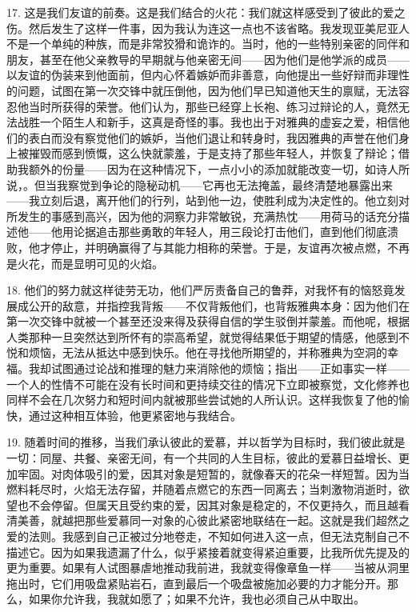 17. 这是我们友谊的前奏。这是我们结合的火花：我们就这样感受到了彼此的爱之伤。然后发生了这样一件事，因为我认为连这一点也不该省略。我发现亚美尼亚人不是一个单纯的种族，而是非常狡猾和诡诈的。当时，他的一些特别亲密的同伴和朋友，甚至在他父亲教导的早期就与他亲密无间——因为他们是他学派的成员——以友谊的伪装来到他面前，但内心怀着嫉妒而非善意，向他提出一些好辩而非理性的问题，试图在第一次交锋中就压倒他，因为他们早已知道他天生的禀赋，无法容忍他当时所获得的荣誉。他们认为，那些已经穿上长袍、练习过辩论的人，竟然无法战胜一个陌生人和新手，这真是奇怪的事。我也出于对雅典的虚妄之爱，相信他们的表白而没有察觉他们的嫉妒，当他们退让和转身时，我因雅典的声誉在他们身上被摧毁而感到愤慨，这么快就蒙羞，于是支持了那些年轻人，并恢复了辩论；借助我额外的份量——因为在这种情况下，一点小小的添加就能改变一切，如诗人所说，。但当我察觉到争论的隐秘动机——它再也无法掩盖，最终清楚地暴露出来——我立刻后退，离开他们的行列，站到他一边，使胜利成为决定性的。他立刻对所发生的事感到高兴，因为他的洞察力非常敏锐，充满热忱——用荷马的话充分描述他——他用论据追击那些勇敢的年轻人，用三段论打击他们，直到他们彻底溃败，他才停止，并明确赢得了与其能力相称的荣誉。于是，友谊再次被点燃，不再是火花，而是显明可见的火焰。\par

18. 他们的努力就这样徒劳无功，他们严厉责备自己的鲁莽，对我怀有的恼怒竟发展成公开的敌意，并指控我背叛——不仅背叛他们，也背叛雅典本身：因为他们在第一次交锋中就被一个甚至还没来得及获得自信的学生驳倒并蒙羞。而他呢，根据人类那种一旦突然达到所怀有的崇高希望，就觉得结果低于期望的情感，他感到不悦和烦恼，无法从抵达中感到快乐。他在寻找他所期望的，并称雅典为空洞的幸福。我却试图通过论战和推理的魅力来消除他的烦恼；指出——正如事实一样——一个人的性情不可能在没有长时间和更持续交往的情况下立即被察觉，文化修养也同样不会在几次努力和短时间内就被那些尝试她的人所认识。这样我恢复了他的愉快，通过这种相互体验，他更紧密地与我结合。\par

19. 随着时间的推移，当我们承认彼此的爱慕，并以哲学为目标时，我们彼此就是一切：同屋、共餐、亲密无间，有一个共同的人生目标，彼此的爱慕日益增长、更加牢固。对肉体吸引的爱，因其对象是短暂的，就像春天的花朵一样短暂。因为当燃料耗尽时，火焰无法存留，并随着点燃它的东西一同离去；当刺激物消逝时，欲望也不会停留。但属天且受约束的爱，因其对象是稳定的，不仅更持久，而且越看清美善，就越把那些爱慕同一对象的心彼此紧密地联结在一起。这就是我们超然之爱的法则。我感到自己正被过分地卷走，不知如何进入这一点，但无法克制自己不描述它。因为如果我遗漏了什么，似乎紧接着就变得紧迫重要，比我所优先提及的更为重要。如果有人试图暴虐地推动我前进，我就变得像章鱼一样——当被从洞里拖出时，它们用吸盘紧贴岩石，直到最后一个吸盘被施加必要的力才能分开。那么，如果你允许我，我就如愿了；如果不允许，我也必须自己从中取出。\par

